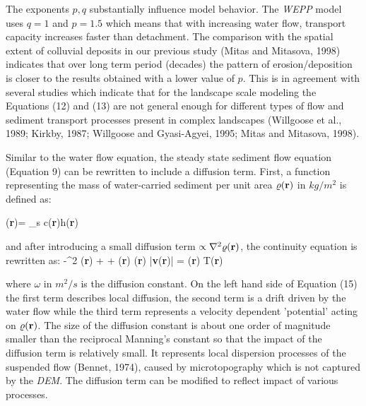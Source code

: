 \documentclass{kapedbk} %
\begin{document}
The exponents $p, q$ substantially influence model behavior.
The {\sl WEPP} model uses $q=1$ and $p=1.5$ which means that with increasing
water flow, transport capacity increases faster than detachment.
The comparison with the spatial extent of colluvial deposits
in our previous study (Mitas and Mitasova, 1998)
indicates that over long term period (decades) 
the pattern of erosion/deposition
is closer to the results obtained with a lower value of $p$.
This is in agreement with several studies
which indicate that for the landscape scale modeling
the Equations (12) and (13) are not general enough for different
types of flow and sediment transport processes
present in complex landscapes
(Willgoose et al., 1989; Kirkby, 1987; Willgoose and
Gyasi-Agyei, 1995; Mitas and Mitasova, 1998).


Similar to the water flow equation, the steady
state sediment flow equation (Equation 9) can be rewritten to include a 
diffusion term. First, a function representing the mass of water-carried 
sediment per unit area $\varrho({\bf r})$ in $kg/m^2$ 
is defined as:

\leftequation
\varrho({\bf r})= \rho_s c({\bf r})h({\bf r})
\endleftequation

\noindent
and after introducing a small diffusion term $\propto \nabla^2 \varrho({\bf r})$,
the continuity equation is rewritten as:
\leftequation
-{\omega {}}\nabla^2 \varrho({\bf r})
+ \nabla\cdot [\varrho({\bf r}){\bf v}({\bf r})]
 + \varrho({\bf r}) \sigma({\bf r}) |{\bf v}({\bf r})|
= \sigma({\bf r}) T({\bf r})
\endleftequation

\noindent
where  $\omega$  in $m^2/s$ is the diffusion constant.
 On the left hand side of Equation (15) the first term
 describes local diffusion,
 the second term is a drift driven by the water flow
 while the third term represents a velocity dependent
'potential' acting on $\varrho({\bf r})$. The size of the diffusion
 constant is about one order of magnitude smaller than the
 reciprocal Manning's constant so that the impact of the diffusion term
is relatively small. It represents local dispersion processes
of the suspended flow (Bennet, 1974), caused by microtopography
which is not captured by the {\sl DEM}.  
The diffusion term can be modified to reflect impact of various processes.
\end{document}
